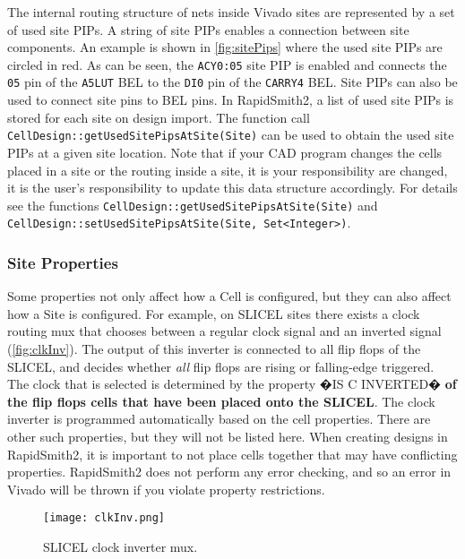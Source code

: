 The internal routing structure of nets inside Vivado sites are represented by
a set of used site PIPs. A string of site PIPs enables a connection between site
components. An example is shown in \autoref{fig:sitePips} where the used site
PIPs are circled in red. As can be seen, the \texttt{ACY0:05} site PIP is
enabled and connects the \texttt{05} pin of the \texttt{A5LUT} BEL to the
\texttt{DI0} pin of the \texttt{CARRY4} BEL. Site PIPs can also be used to 
connect site pins to BEL pins. In RapidSmith2, a list of used site PIPs is
stored for each site on design import. The function call
\texttt{CellDesign::getUsedSitePipsAtSite(Site)} can be used to obtain the used
site PIPs at a given site location. Note that if your CAD program changes 
the cells placed in a site or the routing inside a site, it is your
responsibility are changed, it is the user's responsibility to update this
data structure accordingly.  For details see the functions
\texttt{CellDesign::getUsedSitePipsAtSite(Site)} and 
\texttt{CellDesign::setUsedSitePipsAtSite(Site, Set<Integer>)}.

\subsubsection{Site Properties}
Some properties not only affect how a Cell is configured, but they can also
affect how a Site is configured. For example, on SLICEL sites there exists a
clock routing mux that chooses between a regular clock signal and an inverted
signal (\autoref{fig:clkInv}). The output of this inverter is connected to all
flip flops of the SLICEL, and decides whether \textit{all} flip flops are
rising or falling-edge triggered. The clock that is selected is determined
by the property �IS C INVERTED� \textbf{of the flip flops cells that have been
placed onto the SLICEL}. The clock inverter is programmed automatically based on
the cell properties. There are other such properties, but they will not be listed
here. When creating designs in RapidSmith2, it is important to not place cells
together that may have conflicting properties. RapidSmith2 does not perform any
error checking, and so an error in Vivado will be thrown if you violate
property restrictions.

\begin{figure}[h!]
  \centering
  \texttt{[image: clkInv.png]}
  \caption{SLICEL clock inverter mux.}
  \label{fig:clkInv}
\end{figure}

